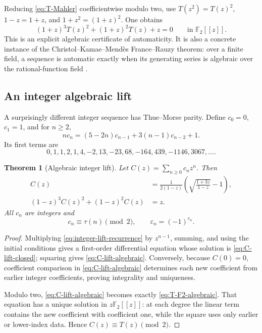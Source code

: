 \documentclass[11pt,oneside]{article}
\newtheorem{theorem}{Theorem}[section]
\theoremstyle{definition}
\theoremstyle{remark}
\newcommand{\Ftwo}{\mathbb F_2}
\newcommand{\eps}{\varepsilon}
\begin{document}
Reducing \eqref{eq:T-Mahler} coefficientwise modulo two, use
\(T(z^2)=T(z)^2\), \(1-z=1+z\), and \(1+z^2=(1+z)^2\).  One obtains
\begin{equation}
  \boxed{
  (1+z)^3T(z)^2+(1+z)^2T(z)+z=0
  \qquad\text{in }\Ftwo[[z]].}                              \label{eq:T-F2-algebraic}
\end{equation}
This is an explicit algebraic certificate of automaticity.  It is also a concrete instance
of the Christol--Kamae--Mend\`es France--Rauzy theorem: over a finite field, a sequence is
automatic exactly when its generating series is algebraic over the rational-function field
\cite{christol1980}.

\subsection{An integer algebraic lift}

A surprisingly different integer sequence has Thue--Morse parity.  Define \(c_0=0\),
\(c_1=1\), and for \(n\ge2\),
\begin{equation}
  nc_n=(5-2n)c_{n-1}+3(n-1)c_{n-2}+1.                       \label{eq:integer-lift-recurrence}
\end{equation}
Its first terms are
\[
  0,1,1,2,1,4,-2,13,-23,68,-164,439,-1146,3067,\ldots .
\]

\begin{theorem}[Algebraic integer lift]
\label{thm:integer-lift}
Let \(C(z)=\sum_{n\ge0}c_nz^n\).  Then
\begin{align}
  C(z)&=\frac{1}{2(1-z)}
    \left(\sqrt{\frac{1+3z}{1-z}}-1\right),                 \label{eq:C-lift-closed}\\
  (1-z)^3C(z)^2+(1-z)^2C(z)&=z.                             \label{eq:C-lift-algebraic}
\end{align}
All \(c_n\) are integers and
\begin{equation}
  \boxed{c_n\equiv\tau(n)\pmod2,
  \qquad \eps_n=(-1)^{c_n}.}                               \label{eq:C-lift-parity}
\end{equation}
\end{theorem}

\begin{proof}
Multiplying \eqref{eq:integer-lift-recurrence} by \(z^{n-1}\), summing, and using the
initial conditions gives a first-order differential equation whose solution is
\eqref{eq:C-lift-closed}; squaring gives \eqref{eq:C-lift-algebraic}.  Conversely, because
\(C(0)=0\), coefficient comparison in \eqref{eq:C-lift-algebraic} determines each new
coefficient from earlier integer coefficients, proving integrality and uniqueness.

Modulo two, \eqref{eq:C-lift-algebraic} becomes exactly
\eqref{eq:T-F2-algebraic}.  That equation has a unique solution in \(z\Ftwo[[z]]\): at each
degree the linear term contains the new coefficient with coefficient one, while the square
uses only earlier or lower-index data.  Hence \(C(z)\equiv T(z)\pmod2\).
\end{proof}
\end{document}
